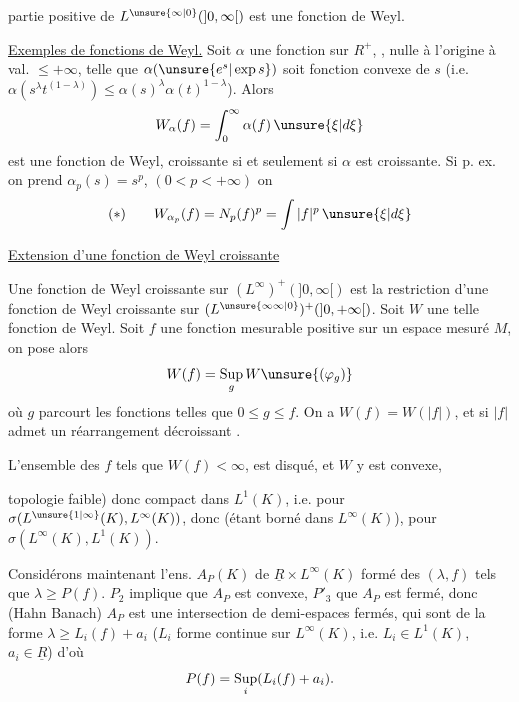 
partie positive de $L^{\unsure{\infty|0}}(]0,\infty[)$  est une fonction de Weyl.

\uline{Exemples de fonctions de Weyl.} Soit $\alpha$ une fonction sur $R^+$, , nulle à l'origine à val. $\leq +\infty$,  telle que $\alpha(\unsure{e^s|\exp s})$ soit fonction convexe de $s$ (i.e. $\alpha(s^\lambda t^{(1-\lambda)})\leq\alpha(s)^\lambda\alpha(t)^{1-\lambda}$). Alors
\[
W_\alpha(f)=\int_0^\infty\alpha(f)\,\unsure{\xi|d\xi}
\]
est une fonction de Weyl, croissante si et seulement si $\alpha$ est croissante. Si p. ex. on prend $\alpha_p(s)=s^p$, $(0<p<+\infty)$ on 
\[
(*)\qquad W_{\alpha_p}(f)=N_p(f)^p=\int|f|^p\,\unsure{\xi|d\xi}
\]

\uline{Extension d'une fonction de Weyl croissante}

Une fonction de Weyl croissante sur $(L^\infty)^+(]0,\infty[)$ est  la restriction d'une fonction de Weyl croissante sur $(L^{\unsure{\infty\infty|0}})^+(]0,+\infty[)$.  Soit $W$ une telle fonction de Weyl. Soit $f$ une fonction mesurable positive sur un espace mesuré $M$, on  pose alors
\[
W(f)=\mathop{\rm Sup}_g W\unsure{(\varphi_g)}
\]
où $g$ parcourt les fonctions   telles que $0\leq g\leq f$. On a  $W(f)=W(|f|)$, et si $|f|$ admet un réarrangement décroissant .

L'ensemble des $f$ tels que $W(f)<\infty$, est  disqué, et $W$ y est convexe,

topologie faible) donc  compact dans $L^1(K)$,  i.e.
pour $\sigma(L^{\unsure{1|\infty}}(K),L^\infty(K))$, donc (étant borné dans $L^\infty(K)$), pour $\sigma(L^\infty(K),L^1(K))$.


Considérons maintenant l'ens. $A_P(K)$ de $\underline{R}\times L^\infty(K)$ formé des $(\lambda,f)$ tels que $\lambda\geq P(f)$.
$P_2$ implique que $A_P$ est convexe, $P'_3$ que $A_P$ est  fermé, donc (Hahn Banach) $A_P$ est une intersection de demi-espaces  fermés, qui sont  de la forme $\lambda\geq L_i(f)+a_i$ ($L_i$ forme  continue sur $L^\infty(K)$, i.e. $L_i\in L^1(K)$,  $a_i\in\underline{R}$) d'où
\[
P(f)=\mathop{\rm Sup}_i(L_i(f)+a_i).
\]

